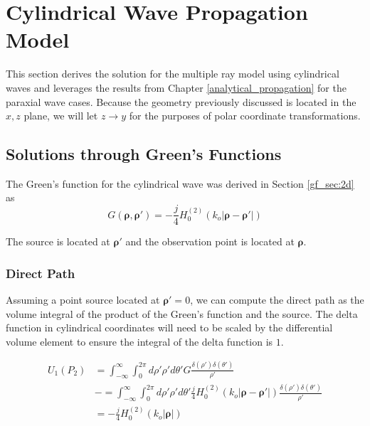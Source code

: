 \chapter{Cylindrical Wave Propagation Model}
\label{cylindrical_propagation}
This section derives the solution for the multiple ray model using cylindrical waves and leverages the results from Chapter \ref{analytical_propagation} for the paraxial wave cases. Because the geometry previously discussed is located in the $x,z$ plane, we will let $z \rightarrow y$ for the purposes of polar coordinate transformations.

\section{Solutions through Green's Functions}
The Green's function for the cylindrical wave was derived in Section \ref{gf_sec:2d} as
\begin{equation}
G\left(\boldsymbol{\rho},\boldsymbol{\rho}'\right) = -\frac{j}{4}H_0^{(2)}\left(k_o|\boldsymbol{\rho} - \boldsymbol{\rho}' | \right)
\label{cyl_eq:1}
\end{equation}
\renewcommand{\baselinestretch}{2} \small\normalsize

The source is located at $\boldsymbol{\rho}'$ and the observation point is located at $\boldsymbol{\rho}$. 

\subsection{Direct Path}
Assuming a point source located at $\boldsymbol{\rho}' = 0$, we can compute the direct path as the volume integral of the product of the Green's function and the source. The delta function in cylindrical coordinates will need to be scaled by the differential volume element to ensure the integral of the delta function is $1$.  

\begin{equation}
\begin{aligned}
U_1(P_2) & = \int_{-\infty}^{\infty}\int_0^{2\pi} d\rho' \rho' d\theta' G\frac{\delta(\rho')\delta(\theta')}{\rho'}\\
&-= \int_{-\infty}^{\infty}\int_0^{2\pi} d\rho' \rho' d\theta' \frac{j}{4}H_0^{(2)}\left(k_o|\boldsymbol{\rho} - \boldsymbol{\rho}' | \right)\frac{\delta(\rho')\delta(\theta')}{\rho'}\\
&=-\frac{j}{4}H_0^{(2)}\left(k_o|\boldsymbol{\rho}| \right)
\label{cyl_eq:2}
\end{aligned}
\end{equation}
\renewcommand{\baselinestretch}{2} \small\normalsize

